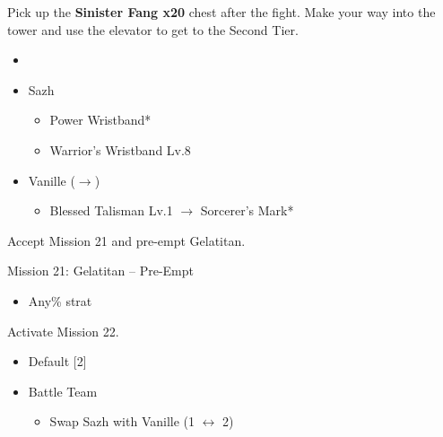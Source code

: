 Pick up the \textbf{Sinister Fang x20} chest after the fight.
Make your way into the tower and use the elevator to get to the Second Tier.

\begin{menu}
	\begin{itemize}
		\paradigm
		\begin{itemize}
			\item {}%
				  {\paradigmline{(\syn)}{\sab}{(\com)}}%
			      {\paradigmline{\com}{\rav}{\rav}}%
			      {\paradigmline[4]{\syn}{(\sab)}{(\rav)}}%
			      {\paradigmline{\com}{(\rav)}{\com}}%
			      {\paradigmline{\rav}{\sab}{(\rav)}}%
			      {\paradigmline{\com}{\med}{\com}}%
		\end{itemize}
		\equip
		\begin{itemize}
			\item Sazh
				\begin{itemize}
					\item Power Wristband*
					\item Warrior's Wristband Lv.8
				\end{itemize}
			\item Vanille ($\rightarrow$)
				\begin{itemize}
					\item Blessed Talisman Lv.1 $\rightarrow$ Sorcerer's Mark*
				\end{itemize}
		\end{itemize}
	\end{itemize}
\end{menu}

\renewcommand{\first}{[1] Bully (\syn/\sab/\com)}
\renewcommand{\second}{[2] Relentless Assault (\com/\rav/\rav)}
\renewcommand{\third}{[3] Guerilla (\syn/\sab/\rav)}
\renewcommand{\fourth}{[4] Aggression (\com/\rav/\com)}
\renewcommand{\fifth}{[5] Smart Bomb (\rav/\sab/\rav)}
\renewcommand{\sixth}{[6] Tireless Charge (\com/\med/\com)}

Accept Mission 21 and pre-empt Gelatitan.

\begin{battle}{Mission 21: Gelatitan -- Pre-Empt}
	\begin{itemize}
		\item Any\% strat
	\end{itemize}
\end{battle}

Activate Mission 22.

\begin{menu}
	\begin{itemize}
		\paradigm
		\begin{itemize}
			\item Default [2]
			\item Battle Team
				\begin{itemize}
					\item Swap Sazh with Vanille (1 $\leftrightarrow$ 2)
				\end{itemize}						      			      	
		\end{itemize}
	\end{itemize}
\end{menu}

